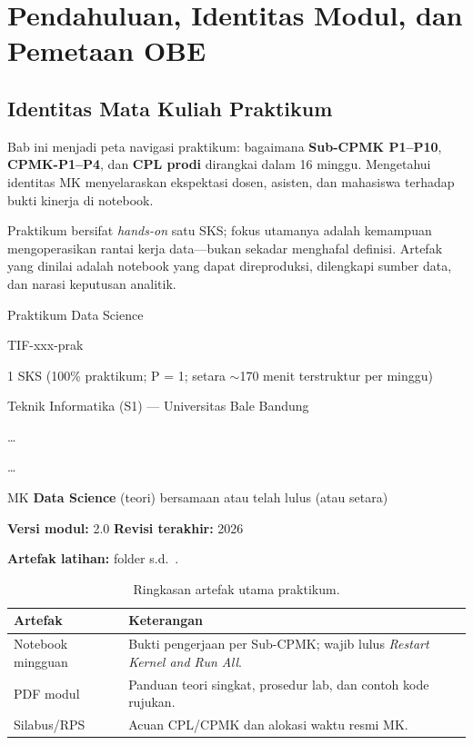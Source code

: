 \documentclass[../main.tex]{subfiles}
\begin{document}
\chapter{Pendahuluan, Identitas Modul, dan Pemetaan OBE}

\section{Identitas Mata Kuliah Praktikum}

Bab ini menjadi peta navigasi praktikum: bagaimana \textbf{Sub-CPMK P1--P10}, \textbf{CPMK-P1--P4}, dan \textbf{CPL prodi} dirangkai dalam 16 minggu. Mengetahui identitas MK menyelaraskan ekspektasi dosen, asisten, dan mahasiswa terhadap bukti kinerja di notebook.

Praktikum bersifat \textit{hands-on} satu SKS; fokus utamanya adalah kemampuan mengoperasikan rantai kerja data---bukan sekadar menghafal definisi. Artefak yang dinilai adalah notebook yang dapat direproduksi, dilengkapi sumber data, dan narasi keputusan analitik.

\begin{description}[style=nextline, widest=Dosen pengampu / koordinator praktikum:, itemsep=0.35em]
  \item[Nama mata kuliah:] Praktikum Data Science
  \item[Kode:] TIF-xxx-prak
  \item[Bobot:] 1 SKS (100\% praktikum; P = 1; setara $\sim$170 menit terstruktur per minggu)
  \item[Program studi:] Teknik Informatika (S1) --- Universitas Bale Bandung
  \item[Semester / tahun akademik:] \ldots
  \item[Dosen pengampu / koordinator praktikum:] \ldots
  \item[Prasyarat / ko-requisit:] MK \textbf{Data Science} (teori) bersamaan atau telah lulus (atau setara)
\end{description}

\noindent\textbf{Versi modul:} 2.0 \quad \textbf{Revisi terakhir:} 2026

\noindent\textbf{Artefak latihan:} folder  s.d.\ .

\begin{table}[htbp]
\centering
\caption{Ringkasan artefak utama praktikum.}
\label{tab:artefak-modul}
\begin{tabular}{@{}p{3.2cm}p{9.5cm}@{}}
\toprule
\textbf{Artefak} & \textbf{Keterangan} \\
\midrule
Notebook mingguan & Bukti pengerjaan per Sub-CPMK; wajib lulus \textit{Restart Kernel and Run All}. \\
PDF modul & Panduan teori singkat, prosedur lab, dan contoh kode rujukan. \\
Silabus/RPS & Acuan CPL/CPMK dan alokasi waktu resmi MK. \\
\bottomrule
\end{tabular}
\end{table}
\end{document}
